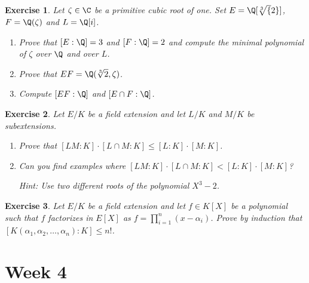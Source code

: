 \documentclass[a4paper,10pt,reqno]{amsart}
\newtheorem{ex}{Exercise}[section]
\begin{document}
\begin{ex}
Let $\zeta\in\C$ be a primitive cubic root of one.
Set $E=\Q[\sqrt[3]{2}]$, $F=\Q(\zeta)$ and $L=\Q[i]$.
\begin{enumerate}[label=(\roman*)]
    \item Prove that $[E:\Q]=3$ and $[F:\Q]=2$ and compute the minimal polynomial of $\zeta$ over $\Q$ and over $L$.
    \item Prove that $EF=\Q(\sqrt[3]{2},\zeta)$.
    \item Compute $[EF:\Q]$ and $[E\cap F:\Q]$.
\end{enumerate}  
\end{ex}

\begin{ex}
    Let $E/K$ be a field extension and let $L/K$ and $M/K$ be subextensions.
    \begin{enumerate}[label=(\roman*)]
    \item Prove that $[LM : K ] \cdot [L \cap M : K] \leq [L:K] \cdot [M:K]$.
    \item Can you find examples where $[LM : K ] \cdot [L \cap M : K] < [L:K] \cdot [M:K]$?
    
    \noindent \textit{Hint:} Use two different roots of the polynomial $X^3 -2$.
    \end{enumerate}  
\end{ex}

\begin{ex}
    Let $E/K$ be a field extension and let $f \in K[X]$ be a polynomial such that $f$ factorizes in $E[X]$ as $f = \prod_{i=1}^n(x - \alpha_i)$. Prove by induction that $[K(\alpha_1,\alpha_2, \ldots, \alpha_n):K] \leq n!$.
\end{ex}

\newpage
\section{Week 4}
\end{document}
